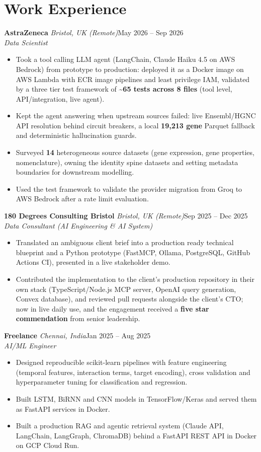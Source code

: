 \documentclass[a4paper,11pt]{article}
\newcommand{\role}[4]{\textbf{#1}{\color{muted}\,\textperiodcentered\,\textit{#2}}\hfill{\color{muted}#3}\\
  \textit{#4}\par}
\newcommand{\gap}{\vspace{5pt}}
\newcommand{\num}[1]{\textbf{#1}}
\begin{document}
\section{Work Experience}
\role{AstraZeneca}{Bristol, UK (Remote)}{May 2026 – Sep 2026}{Data Scientist}
\begin{itemize}
  \item Took a tool calling LLM agent (LangChain, Claude Haiku 4.5 on AWS Bedrock) from prototype to production: deployed it as a Docker image on AWS Lambda with ECR image pipelines and least privilege IAM, validated by a three tier test framework of \num{\textasciitilde65 tests across 8 files} (tool level, API/integration, live agent).
  \item Kept the agent answering when upstream sources failed: live Ensembl/HGNC API resolution behind circuit breakers, a local \num{19,213 gene} Parquet fallback and deterministic hallucination guards.
  \item Surveyed \num{14} heterogeneous source datasets (gene expression, gene properties, nomenclature), owning the identity spine datasets and setting metadata boundaries for downstream modelling.
  \item Used the test framework to validate the provider migration from Groq to AWS Bedrock after a rate limit evaluation.
\end{itemize}
\gap
\role{180 Degrees Consulting Bristol}{Bristol, UK (Remote)}{Sep 2025 – Dec 2025}{Data Consultant (AI Engineering \& AI System)}
\begin{itemize}
  \item Translated an ambiguous client brief into a production ready technical blueprint and a Python prototype (FastMCP, Ollama, PostgreSQL, GitHub Actions CI), presented in a live stakeholder demo.
  \item Contributed the implementation to the client's production repository in their own stack (TypeScript/Node.js MCP server, OpenAI query generation, Convex database), and reviewed pull requests alongside the client's CTO; now in live daily use, and the engagement received a \num{five star commendation} from senior leadership.
\end{itemize}
\gap
\role{Freelance}{Chennai, India}{Jan 2025 – Aug 2025}{AI/ML Engineer}
\begin{itemize}
  \item Designed reproducible scikit-learn pipelines with feature engineering (temporal features, interaction terms, target encoding), cross validation and hyperparameter tuning for classification and regression.
  \item Built LSTM, BiRNN and CNN models in TensorFlow/Keras and served them as FastAPI services in Docker.
  \item Built a production RAG and agentic retrieval system (Claude API, LangChain, LangGraph, ChromaDB) behind a FastAPI REST API in Docker on GCP Cloud Run.
\end{itemize}
\end{document}
